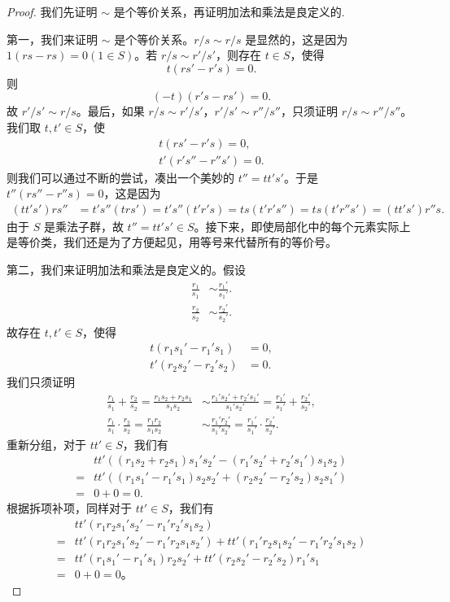 \documentclass[../../main.tex]{subfiles}
\begin{document}
\begin{proof}
我们先证明 $\sim$ 是个等价关系，再证明加法和乘法是良定义的.

第一，我们来证明 $\sim$ 是个等价关系。$r/s \sim r/s$ 是显然的，这是因为 $1(rs - rs) = 0(1 \in S)$。若 $r/s \sim r'/s'$，则存在 $t \in S$，使得
\[t(rs' - r's) = 0 .\]
则
\[(-t)(r's - rs') = 0.\]
故 $r'/s' \sim r/s$。最后，如果 $r/s \sim r'/s'$，$r'/s' \sim r''/s''$，只须证明 $r/s \sim r''/s''$。我们取 $t, t' \in S$，使
\begin{gather*}
t(rs' - r's) = 0 ,\\
t'(r's'' - r''s') = 0 .
\end{gather*}
则我们可以通过不断的尝试，凑出一个美妙的 $t'' = tt's'$。于是 $t''(rs'' - r''s) = 0$，这是因为
\begin{align*}
(tt's')rs'' &= t's''(trs') = t's''(t'r's) = ts(t'r's'') = ts(t'r''s') = (tt's')r''s .
\end{align*}
由于 $S$ 是乘法子群，故 $t'' = tt's' \in S$。接下来，即使局部化中的每个元素实际上是等价类，我们还是为了方便起见，用等号来代替所有的等价号。

第二，我们来证明加法和乘法是良定义的。假设
\begin{align*}
\frac{r_1}{s_1} &\sim \frac{r_1'}{s_1'} .\\
\frac{r_2}{s_2} &\sim \frac{r_2'}{s_2'} .
\end{align*}
故存在 $t, t' \in S$，使得
\begin{align*}
t(r_1s_1' - r_1's_1) &= 0 ,\\
t'(r_2s_2' - r_2's_2) &= 0 .
\end{align*}
我们只须证明
\begin{align*}
\frac{r_1}{s_1} + \frac{r_2}{s_2} = \frac{r_1s_2 + r_2s_1}{s_1s_2} &\sim \frac{r_1's_2' + r_2's_1'}{s_1's_2'} = \frac{r_1'}{s_1'} + \frac{r_2'}{s_2'} ,\\
\frac{r_1}{s_1} \cdot \frac{r_2}{s_2} = \frac{r_1r_2}{s_1s_2} &\sim \frac{r_1'r_2'}{s_1's_2'} = \frac{r_1'}{s_1'} \cdot \frac{r_2'}{s_2'} .
\end{align*}
重新分组，对于 $tt' \in S$，我们有
\begin{align*}
&tt'\left((r_1s_2 + r_2s_1)s_1's_2' - (r_1's_2' + r_2's_1')s_1s_2\right)\\
=&tt'\left((r_1s_1' - r_1's_1)s_2s_2' + (r_2s_2' - r_2's_2)s_2s_1'\right)\\
=&0 + 0 = 0 .
\end{align*}
根据拆项补项，同样对于 $tt' \in S$，我们有
\begin{align*}
&tt'(r_1r_2s_1's_2' - r_1'r_2's_1s_2)\\
=&tt'(r_1r_2s_1's_2' - r_1'r_2s_1s_2') + tt'(r_1'r_2s_1s_2' - r_1'r_2's_1s_2)\\
=&tt'(r_1s_1' - r_1's_1)r_2s_2' + tt'(r_2s_2' - r_2's_2)r_1's_1\\
=&0 + 0 = 0 。
\end{align*}

\end{proof}
\end{document}
